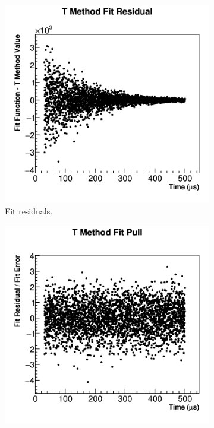 	\begin{figure}[h]
	\centering
	    \begin{subfigure}[]{0.45\textwidth}
		    \centering
			\includegraphics[width=\textwidth]{fitResidual_TMethod}
		    \caption{Fit residuals.}
	    \end{subfigure}
	    \begin{subfigure}[]{0.45\textwidth}
		    \centering
			\includegraphics[width=\textwidth]{fitPull_TMethod}

\end{subfigure}
\end{figure}
